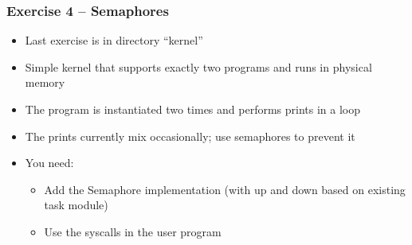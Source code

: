 \begin{frame}[fragile]
    \frametitle{Exercise 4 -- Semaphores}

    \begin{itemize}
        \item Last exercise is in directory ``kernel''
        \item Simple kernel that supports exactly two programs and runs in physical memory
        \item The program is instantiated two times and performs prints in a loop
        \item The prints currently mix occasionally; use semaphores to prevent it
        \item You need:
        \begin{itemize}
            \item Add the Semaphore implementation (with up and down based on existing task module)
            \item Use the syscalls in the user program
        \end{itemize}
    \end{itemize}
\end{frame}
